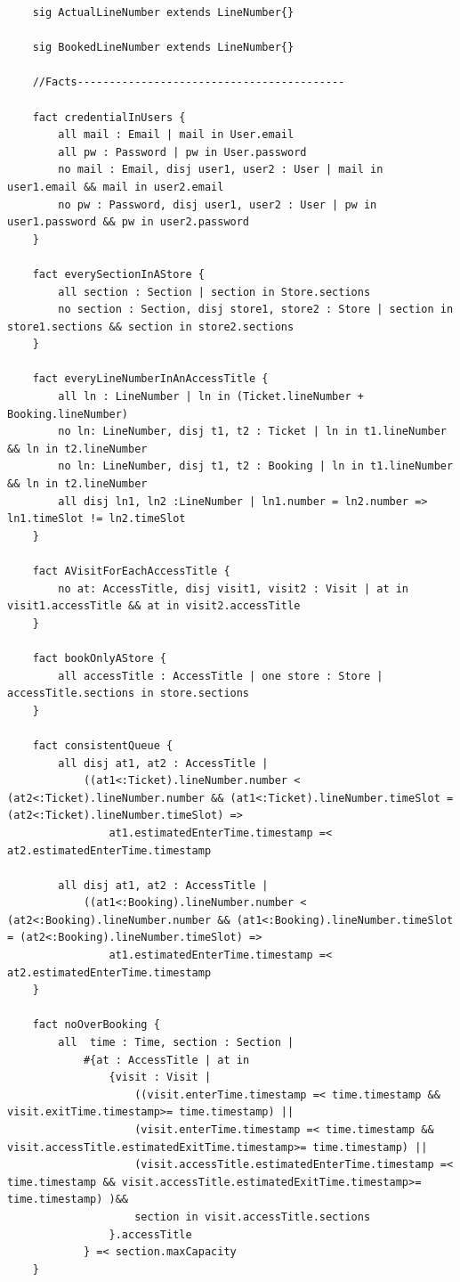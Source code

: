 \begin{lstlisting}
    sig ActualLineNumber extends LineNumber{}

    sig BookedLineNumber extends LineNumber{}

    //Facts------------------------------------------

    fact credentialInUsers {
        all mail : Email | mail in User.email
        all pw : Password | pw in User.password
        no mail : Email, disj user1, user2 : User | mail in user1.email && mail in user2.email
        no pw : Password, disj user1, user2 : User | pw in user1.password && pw in user2.password
    }

    fact everySectionInAStore {
        all section : Section | section in Store.sections
        no section : Section, disj store1, store2 : Store | section in store1.sections && section in store2.sections
    }

    fact everyLineNumberInAnAccessTitle {
        all ln : LineNumber | ln in (Ticket.lineNumber + Booking.lineNumber)
        no ln: LineNumber, disj t1, t2 : Ticket | ln in t1.lineNumber && ln in t2.lineNumber
        no ln: LineNumber, disj t1, t2 : Booking | ln in t1.lineNumber && ln in t2.lineNumber
        all disj ln1, ln2 :LineNumber | ln1.number = ln2.number => ln1.timeSlot != ln2.timeSlot
    }

    fact AVisitForEachAccessTitle {
        no at: AccessTitle, disj visit1, visit2 : Visit | at in visit1.accessTitle && at in visit2.accessTitle
    }

    fact bookOnlyAStore {
        all accessTitle : AccessTitle | one store : Store | accessTitle.sections in store.sections
    }

    fact consistentQueue {
        all disj at1, at2 : AccessTitle |
            ((at1<:Ticket).lineNumber.number < (at2<:Ticket).lineNumber.number && (at1<:Ticket).lineNumber.timeSlot = (at2<:Ticket).lineNumber.timeSlot) =>
                at1.estimatedEnterTime.timestamp =< at2.estimatedEnterTime.timestamp

        all disj at1, at2 : AccessTitle |
            ((at1<:Booking).lineNumber.number < (at2<:Booking).lineNumber.number && (at1<:Booking).lineNumber.timeSlot = (at2<:Booking).lineNumber.timeSlot) =>
                at1.estimatedEnterTime.timestamp =< at2.estimatedEnterTime.timestamp
    }

    fact noOverBooking {
        all  time : Time, section : Section |
            #{at : AccessTitle | at in
                {visit : Visit |
                    ((visit.enterTime.timestamp =< time.timestamp && visit.exitTime.timestamp>= time.timestamp) ||
                    (visit.enterTime.timestamp =< time.timestamp && visit.accessTitle.estimatedExitTime.timestamp>= time.timestamp) ||
                    (visit.accessTitle.estimatedEnterTime.timestamp =< time.timestamp && visit.accessTitle.estimatedExitTime.timestamp>= time.timestamp) )&&
                    section in visit.accessTitle.sections
                }.accessTitle
            } =< section.maxCapacity
    }


\end{lstlisting}
